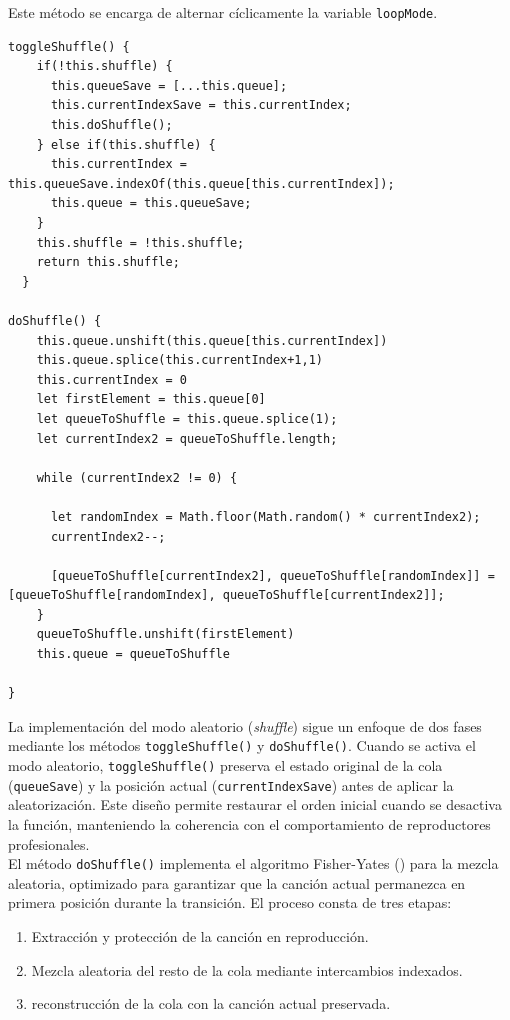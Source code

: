 \documentclass[11pt, a4paper]{article}
\begin{document}
                Este método se encarga de alternar cíclicamente la variable \verb|loopMode|.

                \begin{lstlisting}[caption={Shuffle}]
toggleShuffle() {
    if(!this.shuffle) {
      this.queueSave = [...this.queue];
      this.currentIndexSave = this.currentIndex;
      this.doShuffle();
    } else if(this.shuffle) {
      this.currentIndex = this.queueSave.indexOf(this.queue[this.currentIndex]);
      this.queue = this.queueSave;
    }
    this.shuffle = !this.shuffle;
    return this.shuffle;
  }

doShuffle() {
    this.queue.unshift(this.queue[this.currentIndex])
    this.queue.splice(this.currentIndex+1,1)
    this.currentIndex = 0
    let firstElement = this.queue[0]
    let queueToShuffle = this.queue.splice(1);
    let currentIndex2 = queueToShuffle.length;

    while (currentIndex2 != 0) {

      let randomIndex = Math.floor(Math.random() * currentIndex2);
      currentIndex2--;

      [queueToShuffle[currentIndex2], queueToShuffle[randomIndex]] = [queueToShuffle[randomIndex], queueToShuffle[currentIndex2]];
    }
    queueToShuffle.unshift(firstElement)
    this.queue = queueToShuffle
    
}
                \end{lstlisting}

                La implementación del modo aleatorio (\textit{shuffle}) sigue un enfoque de dos fases mediante los métodos \verb|toggleShuffle()| y \verb|doShuffle()|. Cuando se activa el modo aleatorio, \verb|toggleShuffle()| preserva el estado original de la cola (\verb|queueSave|) y la posición actual (\verb|currentIndexSave|) antes de aplicar la aleatorización. Este diseño permite restaurar el orden inicial cuando se desactiva la función, manteniendo la coherencia con el comportamiento de reproductores profesionales. \\

                El método \verb|doShuffle()| implementa el algoritmo Fisher-Yates (\textcite{wikifisheryates}) para la mezcla aleatoria, optimizado para garantizar que la canción actual permanezca en primera posición durante la transición. El proceso consta de tres etapas: \begin{enumerate}
                  \item Extracción y protección de la canción en reproducción.
                  \item Mezcla aleatoria del resto de la cola mediante intercambios indexados.
                  \item reconstrucción de la cola con la canción actual preservada.
                \end{enumerate}
                
\end{document}
